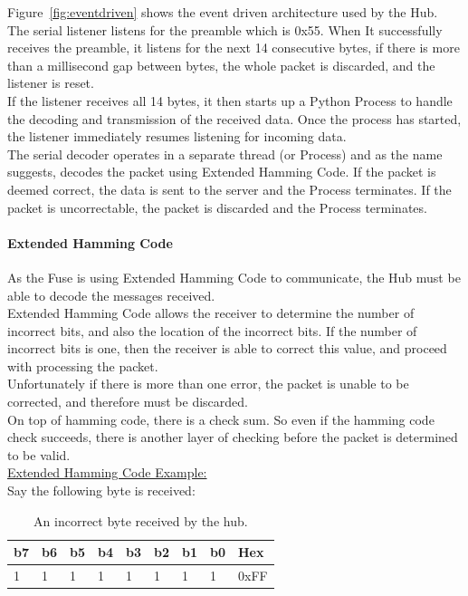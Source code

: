 \documentclass[preprint,12pt,3p]{elsarticle}
\begin{document}
Figure~\ref{fig:eventdriven} shows the event driven architecture used by the Hub.\\
The serial listener listens for the preamble which is 0x55. When It successfully receives the preamble, it listens for the next 14 consecutive bytes, if there is more than a millisecond gap between bytes, the whole packet is discarded, and the listener is reset.\\
If the listener receives all 14 bytes, it then starts up a Python Process to handle the decoding and transmission of the received data. Once the process has started, the listener immediately resumes listening for incoming data.\\ 
The serial decoder operates in a separate thread (or Process) and as the name suggests, decodes the packet using Extended Hamming Code. If the packet is deemed correct, the data is sent to the server and the Process terminates. If the packet is uncorrectable, the packet is discarded and the Process terminates.

\paragraph{Extended Hamming Code}
As the Fuse is using Extended Hamming Code to communicate, the Hub must be able to decode the messages received.\\
Extended Hamming Code allows the receiver to determine the number of incorrect bits, and also the location of the incorrect bits. If the number of incorrect bits is one, then the receiver is able to correct this value, and proceed with processing the packet.\\
Unfortunately if there is more than one error, the packet is unable to be corrected, and therefore must be discarded.\\
On top of hamming code, there is a check sum. So even if the hamming code check succeeds, there is another layer of checking before the packet is determined to be valid.\\[5pt]
\underline{Extended Hamming Code Example:}\\[5pt]
Say the following byte is received:
\begin{table}[H]
\centering
\begin{tabular}{| l | l | l | l | l | l | l | l | l |}
\hline
b7 & b6 & b5 & b4 & b3 & b2 & b1 & b0 & Hex\\ \hline
1 & 1 & 1 & 1 & 1 & 1 & 1 & 1 & 0xFF\\ \hline
\end{tabular}
\caption{An incorrect byte received by the hub.}
\label{tab:incorrectpacket}
\end{table}
\end{document}
